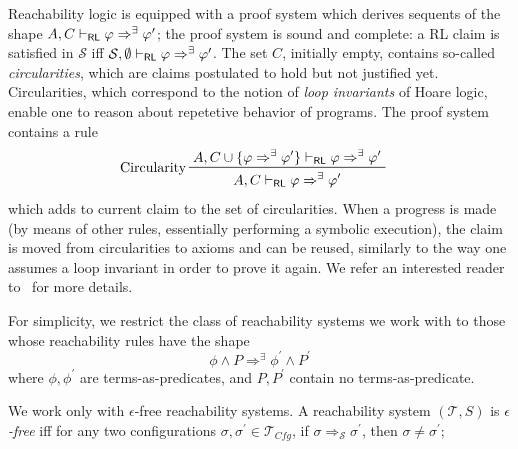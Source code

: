 Reachability logic is equipped with a proof system which derives sequents of the shape
$A, C \vdash_{\mathsf{RL}} \varphi \Rightarrow^\exists \varphi^\prime$;
the proof system is sound and complete: a RL claim is satisfied in $\mathcal{S}$
iff $\mathcal{S}, \emptyset \vdash_{\mathsf{RL}} \varphi \Rightarrow^\exists \varphi^\prime$.
The set $C$, initially empty, contains so-called \emph{circularities},
which are claims postulated to hold but not justified yet.
Circularities, which correspond to the notion of \emph{loop invariants} of Hoare logic,
enable one to reason about repetetive behavior of programs.
The proof system contains a rule
\begin{align*}
    & \prftree[l]{Circularity}
      { A, C \cup \{ \varphi\Rightarrow^\exists \varphi^\prime \} \vdash_\RL \varphi \Rightarrow^\exists \varphi^\prime }
      { A, C \vdash_\RL \varphi \Rightarrow^\exists \varphi^\prime }
\end{align*}
which adds to current claim to the set of circularities.
When a progress is made (by means of other rules, essentially performing a symbolic execution),
the claim is moved from circularities to axioms and can be reused, similarly to the way one assumes a loop invariant
in order to prove it again.
We refer an interested reader to~\cite{RosuS12oopsla} for more details.




\begin{remark}\label{rem:shapeOfReachabilityRules}
For simplicity, we restrict the class of reachability systems we work with to those whose reachability rules
have the shape
\begin{equation*}
    \phi \land P \Rightarrow^\exists \phi^\prime \land P^\prime
\end{equation*}
where $\phi,\phi^\prime$ are terms-as-predicates, and $P,P^\prime$ contain no terms-as-predicate.
\end{remark}

\begin{remark}\label{rem:noEmptySteps}
We work only with $\epsilon$-free reachability systems.
A reachability system $(\mathcal{T}, S)$ is \emph{$\epsilon$-free}
iff for any two configurations $\sigma, \sigma^\prime \in \mathcal{T}_{\mathit{Cfg}}$, if
$\sigma \Rightarrow_{\mathcal{S}} \sigma^\prime$, then $\sigma \not = \sigma^\prime$;
\end{remark}
